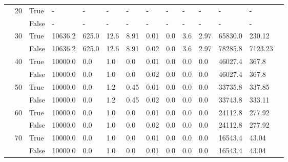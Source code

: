 \begin{appendices}
\begin{landscape}
\begin{small}
\begin{longtable}[c]{@{}lll|ll|ll|ll|ll|lll@{}}
   & 20 & True  & -               & -              & -             & -             & -             & -             & -             & -             & -             & -           &  \\
   &    & False & -               & -              & -             & -             & -             & -             & -             & -             & -             & -           &  \\
   & 30 & True  & 10636.2         & 625.0          & 12.6          & 8.91          & 0.01          & 0.0           & 3.6           & 2.97          & 65830.0       & 230.12      &  \\
   &    & False & 10636.2         & 625.0          & 12.6          & 8.91          & 0.02          & 0.0           & 3.6           & 2.97          & 78285.8       & 7123.23     &  \\
   & 40 & True  & 10000.0         & 0.0            & 1.0           & 0.0           & 0.01          & 0.0           & 0.0           & 0.0           & 46027.4       & 367.8       &  \\
   &    & False & 10000.0         & 0.0            & 1.0           & 0.0           & 0.02          & 0.0           & 0.0           & 0.0           & 46027.4       & 367.8       &  \\
   & 50 & True  & 10000.0         & 0.0            & 1.2           & 0.45          & 0.01          & 0.0           & 0.0           & 0.0           & 33735.8       & 337.85      &  \\
   &    & False & 10000.0         & 0.0            & 1.2           & 0.45          & 0.02          & 0.0           & 0.0           & 0.0           & 33743.8       & 333.11      &  \\
   & 60 & True  & 10000.0         & 0.0            & 1.0           & 0.0           & 0.01          & 0.0           & 0.0           & 0.0           & 24112.8       & 277.92      &  \\
   &    & False & 10000.0         & 0.0            & 1.0           & 0.0           & 0.02          & 0.0           & 0.0           & 0.0           & 24112.8       & 277.92      &  \\
   & 70 & True  & 10000.0         & 0.0            & 1.0           & 0.0           & 0.01          & 0.0           & 0.0           & 0.0           & 16543.4       & 43.04       &  \\
   &    & False & 10000.0         & 0.0            & 1.0           & 0.0           & 0.01          & 0.0           & 0.0           & 0.0           & 16543.4       & 43.04       &  \\

\end{longtable}
\end{small}
\end{landscape}
\end{appendices}
